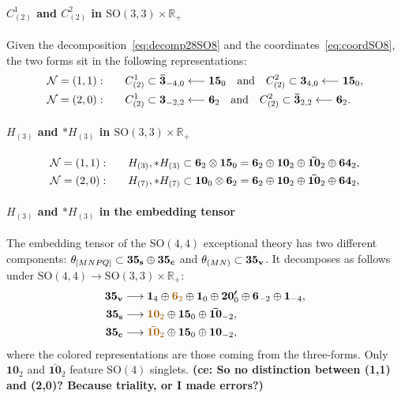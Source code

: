 \documentclass[11pt]{article}
\newcommand{\SO}{\ensuremath{\mathrm{SO}}\xspace}
\newcommand{\R}{\ensuremath{\mathbb{R}}\xspace}
\newcommand{\ce}[1]{\marginpar{\parbox{\marginparwidth}{\boldmath $\Longleftarrow$}}
{\boldmath\bfseries (ce: #1)}}
\begin{document}
\paragraph{\boldmath $C_{(2)}^{1}$ and $C_{(2)}^{2}$ in $\SO(3,3)\times\R_{+}$} Given the decomposition~\eqref{eq:decomp28SO8} and the coordinates~\eqref{eq:coordSO8}, the two forms sit in the following representations:
\begin{equation}
  \begin{aligned}
    {\cal N}=(1,1):&\qquad C^{1}_{(2)}\subset\bm{\bar{3}}_{-4,0} \longleftarrow\bm{15}_{0}\quad{\rm and}\quad C^{2}_{(2)}\subset\bm{3}_{4,0} \longleftarrow\bm{15}_{0},\\
    {\cal N}=(2,0):&\qquad C^{1}_{(2)}\subset\bm{3}_{-2,2} \longleftarrow\bm{6}_{2}\quad{\rm and}\quad C^{2}_{(2)}\subset\bm{\bar{3}}_{2,2} \longleftarrow\bm{6}_{2}.
  \end{aligned}
\end{equation}

\paragraph{\boldmath $H_{(3)}$ and $*H_{(3)}$ in $\SO(3,3)\times\R_{+}$}
\begin{equation}
  \begin{aligned}
    {\cal N}=(1,1):&\qquad H_{(3)},*H_{(3)} \subset\bm{6}_{2}\otimes\bm{15}_{0}=\bm{6}_{2}\oplus\bm{10}_{2}\oplus\bm{\bar{10}}_{2}\oplus\bm{64}_{2},\\
    {\cal N}=(2,0):&\qquad H_{(7)},*H_{(7)} \subset\bm{10}_{0}\otimes\bm{6}_{2}=\bm{6}_{2}\oplus\bm{10}_{2}\oplus\bm{\bar{10}}_{2}\oplus\bm{64}_{2},
  \end{aligned}
\end{equation}

\paragraph{\boldmath $H_{(3)}$ and $*H_{(3)}$ in the embedding tensor} The embedding tensor of the $\SO(4,4)$ exceptional theory has two different components: $\theta_{[MNPQ]}\subset\bm{35_{\rm s}}\oplus\bm{35_{\rm c}}$ and $\theta_{(MN)}\subset\bm{35_{\rm v}}$. It decomposes as follows under $\SO(4,4)\rightarrow\SO(3,3)\times\R_{+}$:
\begin{equation}
  \begin{aligned}
    \bm{35_{\rm v}} &\longrightarrow \bm{1}_{4} \oplus {\color{mydarkorange}\bm{6}_{2}} \oplus \bm{1}_{0} \oplus \bm{20'}_{0} \oplus \bm{6}_{-2} \oplus \bm{1}_{-4},\\
    \bm{35_{\rm s}} &\longrightarrow {\color{mydarkorange}\bm{10}_{2}} \oplus \bm{15}_{0}  \oplus \bm{\bar{10}}_{-2},\\
    \bm{35_{\rm c}} &\longrightarrow {\color{mydarkorange}\bm{\bar{10}}_{2}} \oplus \bm{15}_{0}  \oplus \bm{10}_{-2},
  \end{aligned}
\end{equation}
where the colored representations are those coming from the three-forms. Only $\bm{10}_{2}$ and $\bm{\bar{10}}_{2}$ feature $\SO(4)$ singlets. \ce{So no distinction between (1,1) and (2,0)? Because triality, or I made errors?}
\end{document}
